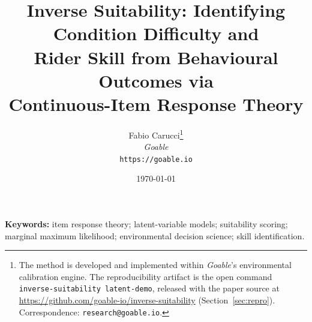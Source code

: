 \documentclass[11pt]{article}
\title{\textbf{Inverse Suitability: Identifying Condition Difficulty and\\
Rider Skill from Behavioural Outcomes via\\ Continuous-Item Response Theory}}
\author{%
  Fabio Carucci\thanks{The method is developed and implemented within
  \emph{Goable}'s environmental calibration engine. The reproducibility artifact
  is the open command \texttt{inverse-suitability latent-demo}, released with the
  paper source at \url{https://github.com/goable-io/inverse-suitability}
  (Section~\ref{sec:repro}). Correspondence: \texttt{research@goable.io}.}\\[2pt]
  \emph{Goable} \\
  \texttt{https://goable.io}%
}
\date{\today}
\begin{document}
\maketitle

\begin{abstract}

\end{abstract}

\noindent\textbf{Keywords:} item response theory; latent-variable models;
suitability scoring; marginal maximum likelihood; environmental decision science;
skill identification.












\appendix




\end{document}
